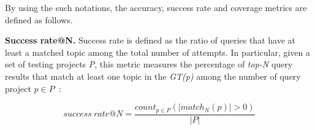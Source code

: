 \noindent By using the such notations, the accuracy, success rate and coverage  metrics are defined as follows.  


\vspace{.1cm}
\noindent\textbf{Success rate@N.} Success rate is defined as the ratio of queries that have at least a matched topic among the total number of attempts. In particular, given a set of testing projects \emph{P}, this metric measures the percentage of \emph{top-N} query results that match at least one topic in the \emph{GT(p)} among the number of query project $p \in P$~\cite{6671293}: %
\vspace{-.1cm}

\begin{equation} \label{eqn:RecallRate}
success\ rate@N=\frac{ count_{p \in P}( \left | match_{N}(p) \right | > 0 ) }{\left | P \right |} %
\end{equation}

\vspace{.1cm}
\vspace{.1cm}




%
%

